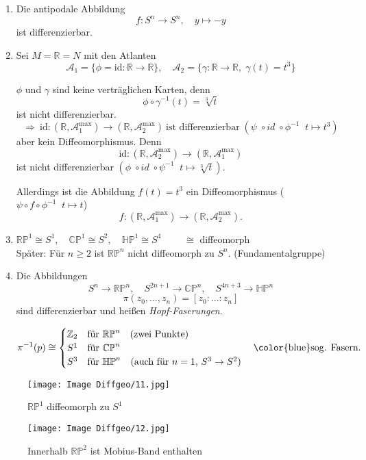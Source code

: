 \documentclass[fleqn, 12pt, letterpaper]{article}
\begin{document}
\begin{enumerate}
  \item Die antipodale Abbildung 
  \[
    f : S^n \to S^n,\quad y \mapsto -y
  \]
  ist differenzierbar.

  \item Sei $M = \mathbb{R} = N$ mit den Atlanten
  \[
    \mathcal{A}_1 = \{ \phi = \text{id} : \mathbb{R} \to \mathbb{R} \},\quad
    \mathcal{A}_2 = \{ \gamma : \mathbb{R} \to \mathbb{R},\; \gamma(t) = t^3 \}
  \]

  $\phi$ und $\gamma$ sind keine verträglichen Karten, denn
  \[
    \phi \circ \gamma^{-1}(t) = \sqrt[3]{t}
  \]
  ist nicht differenzierbar.
  \[
    \Rightarrow\ \text{id} : (\mathbb{R}, \mathcal{A}_1^{\max}) \to (\mathbb{R}, \mathcal{A}_2^{\max})\ \text{ist differenzierbar} \;(\psi \;\circ id \;\circ\phi^{-1}\;\;t\mapsto t^3)
  \]
  aber kein Diffeomorphismus. Denn
  \[
    \text{id} : (\mathbb{R}, \mathcal{A}_2^{\max}) \to (\mathbb{R}, \mathcal{A}_1^{\max})
  \]
  ist nicht differenzierbar $(\phi \;\circ id \;\circ\psi^{-1}\;\;t\mapsto \sqrt[3]{t})$.

  Allerdings ist die Abbildung $f(t) = t^3$ ein Diffeomorphismus ($\psi\circ f\circ\phi^{-1}\;\;t\mapsto t$)
  \[
    f : (\mathbb{R}, \mathcal{A}_1^{\max}) \to (\mathbb{R}, \mathcal{A}_2^{\max}).
  \]
 
   \item $\mathbb{RP}^1 \cong S^1,\quad \mathbb{CP}^1 \cong S^2,\quad \mathbb{HP}^1 \cong S^4\qquad$ $\cong$ diffeomorph\\
  Später: Für $n \geqslant 2$ ist $\mathbb{RP}^n$ nicht diffeomorph zu $S^n$. \quad (Fundamentalgruppe)
  
  \item Die Abbildungen
  \[
    S^n \to \mathbb{RP}^n,\quad S^{2n+1} \to \mathbb{CP}^n,\quad S^{4n+3} \to \mathbb{HP}^n
  \]
  \[
    \pi(z_0, \dots, z_n) = [z_0 : \dots : z_n]
  \]
  sind differenzierbar und heißen \emph{Hopf-Faserungen}.
  
  \[
    \pi^{-1}(p) \cong 
    \begin{cases}
      \mathbb{Z}_2 & \text{für } \mathbb{RP}^n \quad \text{(zwei Punkte)} \\
      S^1 & \text{für } \mathbb{CP}^n \\
      S^3 & \text{für } \mathbb{HP}^n \quad \text{(auch für $n = 1$, $S^3 \to S^2$)}
    \end{cases}
  \quad \text{\color{blue}sog. Fasern.}
  \]
\end{enumerate}
\begin{figure}[H]
  \centering
  \texttt{[image: Image Diffgeo/11.jpg]}
\caption{$\mathbb{RP}^1$ diffeomorph zu $S^1$}
\end{figure}
\begin{figure}[H]
  \centering
  \texttt{[image: Image Diffgeo/12.jpg]}
\caption{Innerhalb $\mathbb{RP}^2$ ist Mobius-Band enthalten}
\end{figure}
\end{document}
